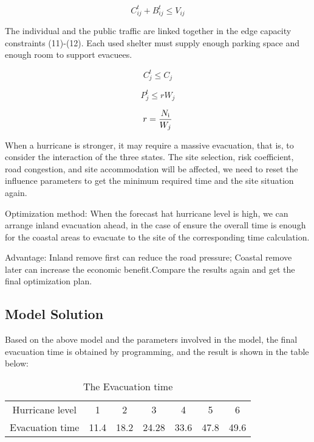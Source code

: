 \documentclass{mcmthesis}
\begin{document}
\begin{equation}\label{12}
C_{ij}^t + B_{ij}^t \le {V_{ij}}
\end{equation}

The individual and the public traffic are linked together in the edge capacity constraints (11)-(12). Each used shelter must supply enough parking space and enough room to support evacuees.

\begin{equation}\label{13}
C_j^t \le {C_j}
\end{equation}

\begin{equation}\label{14}
P_j^t \le r{W_j}
\end{equation}

\begin{equation}\label{15}
r = \frac{{{N_{\rm{i}}}}}{{{W_j}}}
\end{equation}

When a hurricane is stronger, it may require a massive evacuation, that is, to consider the interaction of the three states. The site selection, risk coefficient, road congestion, and site accommodation will be affected, we need to reset the influence parameters to get the minimum required time and the site situation again.

Optimization method: When the forecast hat hurricane level is high, we can arrange inland evacuation ahead, in the case of ensure the overall time is enough for the coastal areas to evacuate to the site of the corresponding time calculation.

Advantage: Inland remove first can reduce the road pressure; Coastal remove later can increase the economic benefit.Compare the results again and get the final optimization plan.

\subsection{Model Solution}
Based on the above model and the parameters involved in the model, the final evacuation time is obtained by programming, and the result is shown in the table below:
\begin{table}[!htb]
\centering
\setlength{\abovecaptionskip}{0pt}%
\setlength{\belowcaptionskip}{10pt}%
\caption{The Evacuation time}
\begin{tabular}{ccccccc}
\toprule[1.5pt]
Hurricane level &1&2&3&4&5&6\\
Evacuation time &11.4&18.2&24.28&33.6&47.8&49.6\\
\bottomrule[1.5pt]
\end{tabular}
\end{table}
\end{document}
